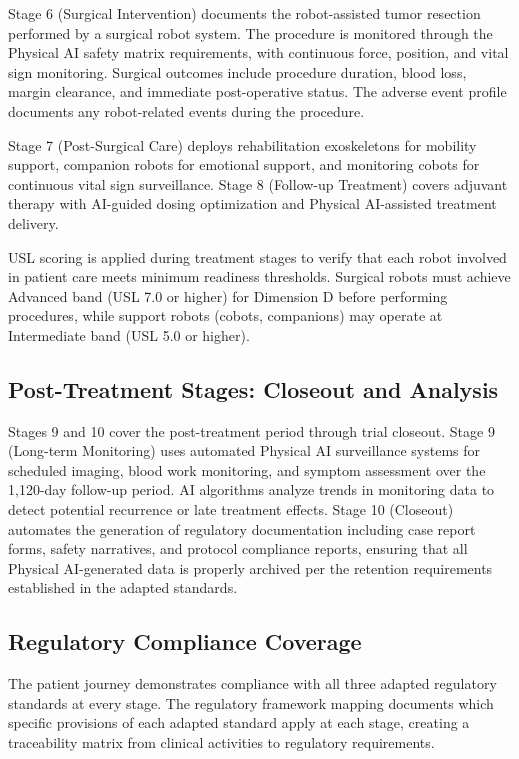 Stage 6 (Surgical Intervention) documents the robot-assisted tumor resection
performed by a surgical robot system. The procedure is monitored through the
Physical AI safety matrix requirements, with continuous force, position, and
vital sign monitoring. Surgical outcomes include procedure duration, blood loss,
margin clearance, and immediate post-operative status. The adverse event
profile documents any robot-related events during the procedure.

Stage 7 (Post-Surgical Care) deploys rehabilitation exoskeletons for mobility
support, companion robots for emotional support, and monitoring cobots for
continuous vital sign surveillance. Stage 8 (Follow-up Treatment) covers
adjuvant therapy with AI-guided dosing optimization and Physical AI-assisted
treatment delivery.

USL scoring \cite{usl-standard} is applied during treatment stages to verify
that each robot involved in patient care meets minimum readiness thresholds.
Surgical robots must achieve Advanced band (USL 7.0 or higher) for Dimension D
before performing procedures, while support robots (cobots, companions) may
operate at Intermediate band (USL 5.0 or higher).

\subsection{Post-Treatment Stages: Closeout and Analysis}
\label{subsec:journey-closeout}

Stages 9 and 10 cover the post-treatment period through trial closeout. Stage 9
(Long-term Monitoring) uses automated Physical AI surveillance systems for
scheduled imaging, blood work monitoring, and symptom assessment over the
1,120-day follow-up period. AI algorithms analyze trends in monitoring data to
detect potential recurrence or late treatment effects. Stage 10 (Closeout)
automates the generation of regulatory documentation including case report
forms, safety narratives, and protocol compliance reports, ensuring that all
Physical AI-generated data is properly archived per the retention requirements
established in the adapted standards.

\subsection{Regulatory Compliance Coverage}
\label{subsec:journey-compliance}

The patient journey demonstrates compliance with all three adapted regulatory
standards at every stage. The regulatory framework mapping documents which
specific provisions of each adapted standard apply at each stage, creating a
traceability matrix from clinical activities to regulatory requirements.

